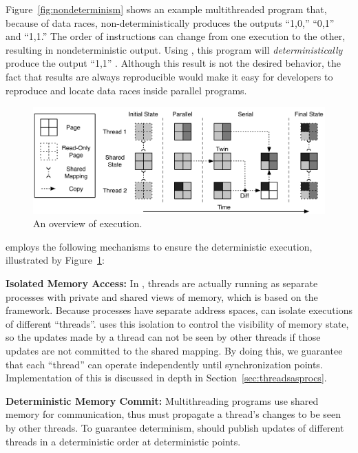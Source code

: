 Figure~\ref{fig:nondeterminism} shows an example multithreaded program that, because of data races, non-deterministically produces the outputs ``1,0,'' ``0,1'' and ``1,1.''  The order of instructions can change from one execution to the other, resulting in nondeterministic output. Using \dthreads{}, this program will \emph{deterministically} produce the output ``1,1'' . Although this result is not the desired behavior, the fact that results are always reproducible would make it easy for developers to reproduce and locate data races inside parallel programs.

\begin{figure}[h]
{\centering
\includegraphics{dthreads/figure/architecture-diagram}
\caption{An overview of \dthreads{} execution.\label{fig:architecture}}
}
\end{figure}

\dthreads{} employs the following mechanisms to ensure the deterministic execution, illustrated by Figure~\ref{fig:architecture}: 

\textbf{Isolated Memory Access:} In \dthreads{}, threads are actually running as separate processes with private and shared views of memory, which is based on the \sheriff{} framework. Because processes have separate address spaces, \dthreads{} can isolate executions of different ``threads''. \dthreads{} uses this isolation to control the visibility of memory state, so the updates made by a thread can not be seen by other threads if those updates are not committed to the shared mapping. By doing this, we guarantee that each ``thread'' can operate independently until synchronization points. Implementation of this is discussed in depth in Section~\ref{sec:threadsasprocs}.

\textbf{Deterministic Memory Commit:} 
Multithreading programs use shared memory for communication, thus \dthreads{} must propagate a thread's changes to be seen by other threads. To guarantee determinism, \dthreads{} should publish updates of different threads in a deterministic order at deterministic points.

